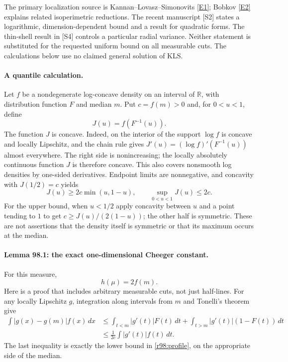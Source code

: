 \documentclass[11pt]{article}
\begin{document}
The primary localization source is Kannan--Lovasz--Simonovits
\href{https://www.renyi.hu/~miki/KannanLovSimIso.pdf}{[E1]}; Bobkov
\href{https://www-users.cse.umn.edu/~bobkov/papers/2007_LNM_Isop.log-concave.pdf}{[E2]}
explains related isoperimetric reductions. The recent manuscript [S2]
states a logarithmic, dimension-dependent bound and a result for
quadratic forms. The thin-shell result in [S4] controls a particular
radial variance. Neither statement is substituted for the requested
uniform bound on all measurable cuts. The calculations below use no
claimed general solution of KLS.

\paragraph{A quantile calculation.}
Let $f$ be a nondegenerate log-concave density on an interval of
$\mathbb R$, with distribution function $F$ and median $m$.
Put $c=f(m)>0$ and, for $0<u<1$, define
\[
                         J(u)=f(F^{-1}(u)).
\]
The function $J$ is concave. Indeed, on the interior of the support
$\log f$ is concave and locally Lipschitz, and the chain rule gives
$J'(u)=(\log f)'(F^{-1}(u))$ almost everywhere. The right side is
nonincreasing; the locally absolutely continuous function $J$ is
therefore concave. This also covers nonsmooth log densities by
one-sided derivatives. Endpoint limits are nonnegative, and concavity
with $J(1/2)=c$ yields
\begin{equation}\label{r98:profile}
  J(u)\ge2c\min(u,1-u),\qquad
                           \sup_{0<u<1}J(u)\le2c.
\end{equation}
For the upper bound, when $u<1/2$ apply concavity between $u$ and a
point tending to $1$ to get $c\ge J(u)/(2(1-u))$; the other half is
symmetric. These are not assertions that the density itself is
symmetric or that its maximum occurs at the median.

\paragraph{Lemma 98.1: the exact one-dimensional Cheeger constant.}
For this measure,
\begin{equation}\label{r98:exact}
                              h(\mu)=2f(m).
\end{equation}
Here is a proof that includes arbitrary measurable cuts, not just
half-lines. For any locally Lipschitz $g$, integration along intervals
from $m$ and Tonelli's theorem give
\begin{align*}
 \int |g(x)-g(m)|f(x)\,dx
 &\le \int_{t<m}|g'(t)|F(t)\,dt
       +\int_{t>m}|g'(t)|(1-F(t))\,dt\\
 &\le \frac1{2c}\int |g'(t)|f(t)\,dt.
\end{align*}
The last inequality is exactly the lower bound in
\eqref{r98:profile}, on the appropriate side of the median.
\end{document}
